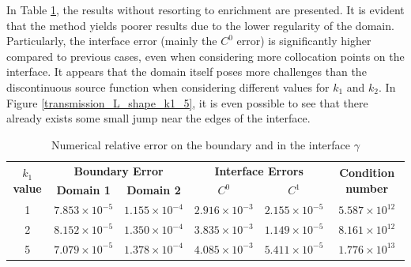 In Table \ref{tab:transmission_results_L_shape_rectangles}, the results without resorting to enrichment are presented. It is evident that the method yields poorer results due to the lower regularity of the domain. Particularly, the interface error (mainly the \(C^0\) error) is significantly higher compared to previous cases, even when considering more collocation points on the interface. It appears that the domain itself poses more challenges than the discontinuous source function when considering different values for \(k_1\) and \(k_2\). In Figure \ref{transmission_L_shape_k1_5}, it is even possible to see that there already exists some small jump near the edges of the interface.

\begin{table}[!htbp]
    \centering
    \begin{tabular}{cccccc}
      \toprule
      \multirow{2}{*}{\textbf{\(k_1\) value}} & \multicolumn{2}{c}{\textbf{Boundary Error}} & \multicolumn{2}{c}{\textbf{Interface Errors}} & \multirow{2}{*}{\textbf{Condition number}} \\
      \cmidrule(lr){2-3} \cmidrule(lr){4-5}
      & \textbf{Domain 1} & \textbf{Domain 2} & \textbf{\(C^0\)} & \textbf{\(C^1\)} & \\
      \midrule
      1 & $7.853\times10^{-5}$ & $1.155\times10^{-4}$ & $2.916\times10^{-3}$ & $2.155\times10^{-5}$ & $5.587\times 10^{12}$ \\
      2 & $8.152\times10^{-5}$ & $1.350\times10^{-4}$ & $3.835\times10^{-3}$ & $1.149\times10^{-5}$ & $8.161\times 10^{12}$ \\
      5 & $7.079\times10^{-5}$ & $1.378\times10^{-4}$ & $4.085\times10^{-3}$ & $5.411\times10^{-5}$ & $1.776\times 10^{13}$ \\
      \bottomrule
    \end{tabular}
    \caption{Numerical relative error on the boundary and in the interface \(\gamma\)}
    \label{tab:transmission_results_L_shape_rectangles}
\end{table}



